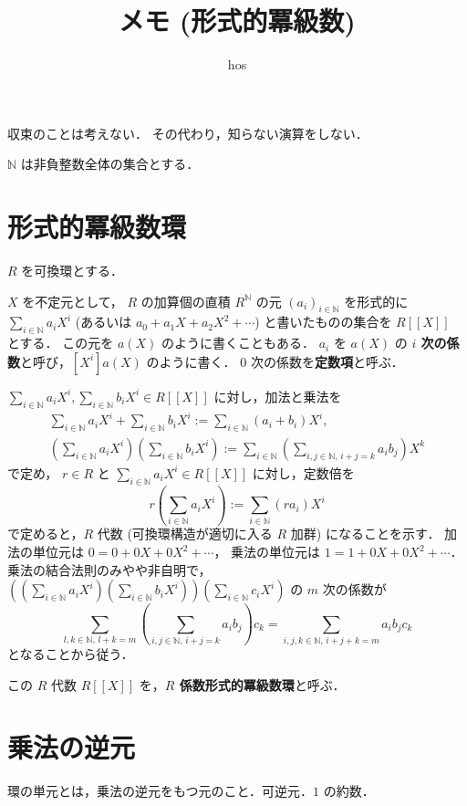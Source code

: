 \documentclass{jsarticle}
\title{メモ (形式的冪級数)}
\author{hos}
\newcommand{\N}{\mathbb{N}}
\theoremstyle{definition}
\begin{document}
\maketitle

収束のことは考えない．
その代わり，知らない演算をしない．

$\N$ は非負整数全体の集合とする．

\section{形式的冪級数環}
$R$ を可換環とする．

$X$ を不定元として，
$R$ の加算個の直積 $R^\N$ の元 $(a_i)_{i\in\N}$ を形式的に
$\sum_{i\in\N} a_i X^i$ (あるいは $a_0 + a_1 X + a_2 X^2 + \cdots$) と書いたものの集合を $R[[X]]$ とする．
この元を $a(X)$ のように書くこともある．
$a_i$ を $a(X)$ の \textbf{$i$ 次の係数}と呼び，$[X^i] a(X)$ のように書く．
$0$ 次の係数を\textbf{定数項}と呼ぶ．

$\sum_{i\in\N} a_i X^i, \sum_{i\in\N} b_iX^i \in R[[X]]$ に対し，加法と乗法を
\begin{align*}
  \sum_{i\in\N} a_i X^i + \sum_{i\in\N} b_i X^i := \sum_{i\in\N} (a_i + b_i) X^i, \\
  \left(\sum_{i\in\N} a_i X^i\right) \left(\sum_{i\in\N} b_i X^i\right) := \sum_{i\in\N} \left(\sum_{i,j\in\N,\,i+j=k} a_i b_j\right) X^k
\end{align*}
で定め，
$r \in R$ と $\sum_{i\in\N} a_i X^i \in R[[X]]$ に対し，定数倍を
\[
  r \left(\sum_{i\in\N} a_i X^i\right) := \sum_{i\in\N} (r a_i) X^i
\]
で定めると，$R$ 代数 (可換環構造が適切に入る $R$ 加群) になることを示す．
加法の単位元は $0 = 0 + 0 X + 0 X^2 + \cdots$，
乗法の単位元は $1 = 1 + 0 X + 0 X^2 + \cdots$．
乗法の結合法則のみやや非自明で，
$\left(\left(\sum_{i\in\N} a_i X^i\right) \left(\sum_{i\in\N} b_i X^i\right)\right) \left(\sum_{i\in\N} c_i X^i\right)$ の
$m$ 次の係数が
\[
  \sum_{l,k\in\N,\,l+k=m} \left(\sum_{i,j\in\N,\,i+j=k} a_i b_j\right) c_k = \sum_{i,j,k\in\N,\,i+j+k=m} a_i b_j c_k
\]
となることから従う．

この $R$ 代数 $R[[X]]$ を，\textbf{$R$ 係数形式的冪級数環}と呼ぶ．


\section{乗法の逆元}
環の単元とは，乗法の逆元をもつ元のこと．可逆元．$1$ の約数．
\end{document}
